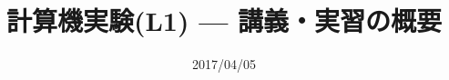 \documentclass[dvipdfmx]{beamer}
\title{計算機実験(L1) --- 講義・実習の概要}
\date{2017/04/05}
\begin{document}
\begin{frame}
  \titlepage
  \tableofcontents
\end{frame}





\end{document}
